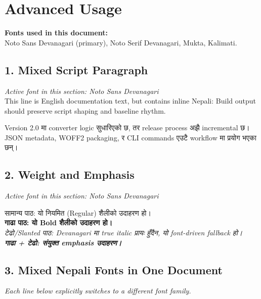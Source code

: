 \documentclass{article}
\begin{document}
\section*{Advanced Usage}
\textbf{Fonts used in this document:}\\
Noto Sans Devanagari (primary), Noto Serif Devanagari, Mukta, Kalimati.

\subsection*{1. Mixed Script Paragraph}
\textit{Active font in this section: Noto Sans Devanagari}\\
This line is English documentation text, but contains inline Nepali:
Build output should preserve script shaping and baseline rhythm.

\begin{nepali}
Version 2.0 मा converter logic सुधारिएको छ, तर release process अझै incremental छ।
JSON metadata, WOFF2 packaging, र CLI commands एउटै workflow मा प्रयोग भएका छन्।
\end{nepali}

\subsection*{2. Weight and Emphasis}
\textit{Active font in this section: Noto Sans Devanagari}\\
\begin{nepali}
सामान्य पाठ: यो नियमित (Regular) शैलीको उदाहरण हो।\\
\textbf{गाढा पाठ: यो Bold शैलीको उदाहरण हो।}\\
\textit{टेढो/Slanted पाठ: Devanagari मा true italic प्रायः हुँदैन, यो font-driven fallback हो।}\\
\textbf{\textit{गाढा + टेढो: संयुक्त emphasis उदाहरण।}}
\end{nepali}

\subsection*{3. Mixed Nepali Fonts in One Document}
\textit{Each line below explicitly switches to a different font family.}
{\nepalifont{}}\\[0.4em]
{\nepaliserif{}}\\[0.4em]
{\nepalimukta{}}\\[0.4em]
{\nepalikalimati{}}
\end{document}
